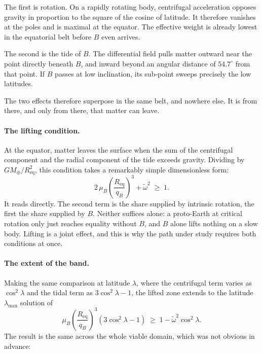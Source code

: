 \documentclass[11pt,a4paper,openany]{report}
\newcommand{\Mt}{M_{\oplus}}
\newcommand{\Req}{R_{\mathrm{eq}}}
\begin{document}
The first is rotation. On a rapidly rotating body, centrifugal acceleration opposes gravity in
proportion to the square of the cosine of latitude. It therefore vanishes at the poles and is
maximal at the equator. The effective weight is already lowest in the equatorial belt before $B$
even arrives.

The second is the tide of $B$. The differential field pulls matter outward near the point directly
beneath $B$, and inward beyond an angular distance of $54.7^\circ$ from that point. If $B$ passes
at low inclination, its sub-point sweeps precisely the low latitudes.

The two effects therefore superpose in the same belt, and nowhere else. It is from there, and only
from there, that matter can leave.

\paragraph{The lifting condition.} At the equator, matter leaves the surface when the sum of the
centrifugal component and the radial component of the tide exceeds gravity. Dividing by
$G\Mt/\Req^2$, this condition takes a remarkably simple dimensionless form:
\begin{equation}
\boxed{\;2\,\mu_B\left(\frac{\Req}{q_B}\right)^{3}+\tilde\omega^{2}\;\ge\;1.\;}
\label{eq:soulevement}
\end{equation}
It reads directly. The second term is the share supplied by intrinsic rotation, the first the share
supplied by $B$. Neither suffices alone: a proto-Earth at critical rotation only just reaches
equality without $B$, and $B$ alone lifts nothing on a slow body. Lifting is a joint effect, and
this is why the path under study requires both conditions at once.

\paragraph{The extent of the band.} Making the same comparison at latitude $\lambda$, where the
centrifugal term varies as $\cos^2\lambda$ and the tidal term as $3\cos^2\lambda-1$, the lifted
zone extends to the latitude $\lambda_{\max}$ solution of
\begin{equation}
\mu_B\left(\frac{\Req}{q_B}\right)^{3}\left(3\cos^{2}\lambda-1\right)
\;\ge\;1-\tilde\omega^{2}\cos^{2}\lambda .
\label{eq:bande}
\end{equation}
The result is the same across the whole viable domain, which was not obvious in advance:
\end{document}
